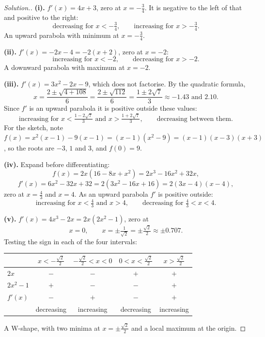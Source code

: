\documentclass[11pt,a4paper]{article}
\theoremstyle{definition}
\newenvironment{solution}
  {\renewcommand{\qedsymbol}{}\begin{proof}[\textit{Solution}.]}
  {\end{proof}}
\begin{document}
\begin{solution}
\textbf{(i).} $f'(x)=4x+3$, zero at $x=-\frac{3}{4}$. It is negative to the left of that
and positive to the right:
$$\text{decreasing for } x<-\tfrac{3}{4},\qquad
\text{increasing for } x>-\tfrac{3}{4}.$$
An upward parabola with minimum at $x=-\frac{3}{4}$.

\textbf{(ii).} $f'(x)=-2x-4=-2(x+2)$, zero at $x=-2$:
$$\text{increasing for } x<-2,\qquad \text{decreasing for } x>-2.$$
A downward parabola with maximum at $x=-2$.

\textbf{(iii).} $f'(x)=3x^2-2x-9$, which does not factorise. By the quadratic formula,
$$x=\frac{2\pm\sqrt{4+108}}{6}=\frac{2\pm\sqrt{112}}{6}=\frac{1\pm 2\sqrt{7}}{3}
\approx -1.43 \text{ and } 2.10.$$
Since $f'$ is an upward parabola it is positive outside these values:
$$\text{increasing for } x<\tfrac{1-2\sqrt{7}}{3} \text{ and }
x>\tfrac{1+2\sqrt{7}}{3},\qquad \text{decreasing between them}.$$
For the sketch, note $f(x)=x^2(x-1)-9(x-1)=(x-1)\left(x^2-9\right)=(x-1)(x-3)(x+3)$, so
the roots are $-3$, $1$ and $3$, and $f(0)=9$.

\textbf{(iv).} Expand before differentiating:
$$f(x)=2x\left(16-8x+x^2\right)=2x^3-16x^2+32x,$$
$$f'(x)=6x^2-32x+32=2\left(3x^2-16x+16\right)=2(3x-4)(x-4),$$
zero at $x=\frac{4}{3}$ and $x=4$. As an upward parabola $f'$ is positive outside:
$$\text{increasing for } x<\tfrac{4}{3} \text{ and } x>4,\qquad
\text{decreasing for } \tfrac{4}{3}<x<4.$$

\textbf{(v).} $f'(x)=4x^3-2x=2x\left(2x^2-1\right)$, zero at
$$x=0,\qquad x=\pm\tfrac{1}{\sqrt{2}}=\pm\tfrac{\sqrt{2}}{2}\approx\pm 0.707.$$
Testing the sign in each of the four intervals:

\begin{table}[H]
\centering
\begin{tabular}{|l|c|c|c|c|}
\hline
 & $x<-\frac{\sqrt{2}}{2}$ & $-\frac{\sqrt{2}}{2}<x<0$ & $0<x<\frac{\sqrt{2}}{2}$
 & $x>\frac{\sqrt{2}}{2}$\\
\hline
$2x$ & $-$ & $-$ & $+$ & $+$\\
$2x^2-1$ & $+$ & $-$ & $-$ & $+$\\
$f'(x)$ & $-$ & $+$ & $-$ & $+$\\
\hline
 & decreasing & increasing & decreasing & increasing\\
\hline
\end{tabular}
\end{table}

A W-shape, with two minima at $x=\pm\frac{\sqrt{2}}{2}$ and a local maximum at the
origin.


\end{solution}
\end{document}
